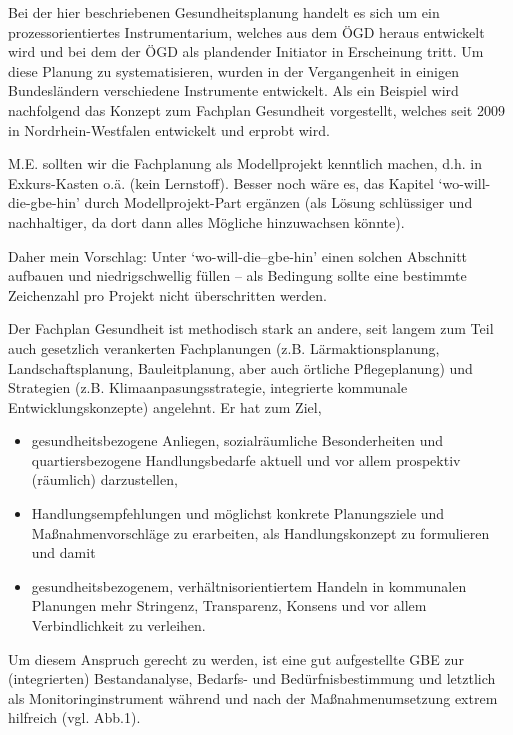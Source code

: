 \documentclass{article}
\begin{document}
Bei der hier beschriebenen Gesundheitsplanung handelt es sich um ein prozessorientiertes Instrumentarium, welches aus dem ÖGD heraus entwickelt wird und bei dem der ÖGD als plandender Initiator in Erscheinung tritt. Um diese Planung zu systematisieren, wurden in der Vergangenheit in einigen Bundesländern verschiedene Instrumente entwickelt. Als ein Beispiel wird nachfolgend das Konzept zum Fachplan Gesundheit vorgestellt, welches seit 2009 in Nordrhein-Westfalen entwickelt und erprobt wird. 


M.E. sollten wir die Fachplanung als Modellprojekt kenntlich machen, d.h. in Exkurs-Kasten o.ä. (kein Lernstoff). Besser noch wäre es, das Kapitel ‘wo-will-die-gbe-hin’ durch Modellprojekt-Part ergänzen (als Lösung schlüssiger und nachhaltiger, da dort dann alles Mögliche hinzuwachsen könnte).


Daher mein Vorschlag: Unter ‘wo-will-die--gbe-hin’ einen solchen Abschnitt aufbauen und niedrigschwellig füllen – als Bedingung sollte eine bestimmte Zeichenzahl pro Projekt nicht überschritten werden.


Der Fachplan Gesundheit ist methodisch stark an andere, seit langem zum Teil auch gesetzlich verankerten Fachplanungen (z.B. Lärmaktionsplanung, Landschaftsplanung, Bauleitplanung, aber auch örtliche Pflegeplanung) und Strategien (z.B. Klimaanpasungsstrategie, integrierte kommunale Entwicklungskonzepte) angelehnt. Er hat zum Ziel,

\begin{itemize}
\item gesundheitsbezogene Anliegen, sozialräumliche Besonderheiten und quartiersbezogene Handlungsbedarfe aktuell und vor allem prospektiv (räumlich) darzustellen, 


\item Handlungsempfehlungen und möglichst konkrete Planungsziele und Maßnahmenvorschläge zu erarbeiten, als Handlungskonzept zu formulieren und damit


\item gesundheitsbezogenem, verhältnisorientiertem Handeln in kommunalen Planungen mehr Stringenz, Transparenz, Konsens und vor allem Verbindlichkeit zu verleihen.


\end{itemize}

Um diesem Anspruch gerecht zu werden, ist eine gut aufgestellte GBE zur (integrierten) Bestandanalyse, Bedarfs- und Bedürfnisbestimmung und letztlich als Monitoringinstrument während und nach der Maßnahmenumsetzung extrem hilfreich (vgl. Abb.1). 
\end{document}
